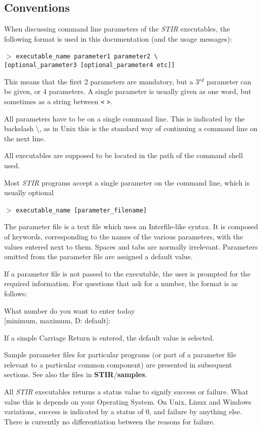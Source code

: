 \documentclass{article}
\newcommand{\tab}{\hspace{5mm}}
\newcommand{\cmdline}[1]{\par \noindent $>$ \texttt{#1}\par}
\begin{document}
\subsection{
Conventions}
\label{sec:conventions}
When discussing command line parameters of the \textit{STIR} executables, 
the following format is used in this documentation (and the usage messages):
\cmdline{executable\_name parameter1 parameter2 {\textbackslash}\\
{[}optional\_parameter3 [optional\_parameter4 etc]]}


This means that the first 2 parameters are mandatory, but a 3$^{rd}$ 
parameter can be given, or 4 parameters. A single parameter is 
usually given as one word, but sometimes as a string between 
\texttt{<} \texttt{>}. 


All parameters have to be on a single command line. This is indicated 
by the backslash {\textbackslash}, as in Unix this is the standard way 
of continuing a command line on the next line.


All executables are supposed to be located in the path of the 
command shell used.


Most \textit{STIR} programs accept a single parameter on the command 
line, which is usually optional
\cmdline{executable\_name [parameter\_filename]}


The parameter file is a text file which uses an Interfile-like 
syntax. It is composed of keywords, corresponding to the names 
of the various parameters, with the values entered next to them. 
Spaces and tabs are normally irrelevant. Parameters omitted from 
the parameter file are assigned a default value. 


If a parameter file is not passed to the executable, the user 
is prompted for the required information. For questions that 
ask for a number, the format is as follows:


\tab What number do you want to enter today \\
\tab [minimum, maximum, D: default]:


If a simple Carriage Return is entered, the default value is 
selected.


Sample parameter files for particular programs (or part of a 
parameter file relevant to a particular common component) are 
presented in subsequent sections. See also the files in \textbf{STIR}/\textbf{samples}.



All \textit{STIR} executables returns a status value to signify success 
or failure. What value this is depends on your Operating System. 
On Unix, Linux and Windows variations, success is indicated by 
a status of 0, and failure by anything else. There is currently 
no differentiation between the reasons for failure.
\end{document}
